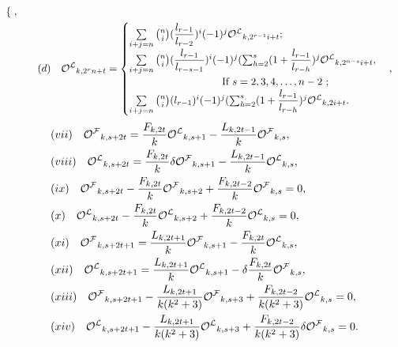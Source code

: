 \begin{theorem}
\begin{align*}
\begin{cases}
 \end{cases},\\
 &\qquad (d)\quad  {{\mathcal{O^L}}}_{k,{2^rn+t}}= \begin{cases}
\sum\limits_{i+j=n}\binom{n}{i}(\dfrac{l_{r-1}}{l_{r-2}})^i(-1)^j {{\mathcal{O^L}}}_{k,2^{r-1}i+t};\\
\sum\limits_{i+j=n}\binom{n}{i}(\dfrac{l_{r-1}}{l_{r-s-1}})^i(-1)^j (\sum_{h=2}^s(1+\dfrac{l_{r-1}}{l_{r-h}})^j{{\mathcal{O^L}}}_{k,2^{n-s}i+t}, &\\\quad\quad\quad\quad\quad\qquad\qquad \text{If $s=2, 3, 4,\hdots, n-2 $ };\\\sum\limits_{i+j=n}\binom{n}{i}({l_{r-1}})^i(-1)^j (\sum_{h=2}^s(1+\dfrac{l_{r-1}}{l_{r-h}})^j{{\mathcal{O^L}}}_{k,2i+t}.
 \end{cases},\\
 \end{align*}
\begin{align*}
 &(vii)\quad{{\mathcal{O^F}}}_{k,s+2t}=\dfrac{{F}_{k,2t}}{k}{{\mathcal{O^L}}}_{k,s+1}-\dfrac{{L}_{k,2t-1}}{k}{{\mathcal{O^F}}}_{k,s},\\
&(viii)\quad{{\mathcal{O^L}}}_{k,s+2t}=\dfrac{{F}_{k,2t}}{k}\delta{{\mathcal{O^F}}}_{k,s+1}-\dfrac{{L}_{k,2t-1}}{k}{{\mathcal{O^L}}}_{k,s},\\
&(ix)\quad{{\mathcal{O^F}}}_{k,s+2t}-\dfrac{{F}_{k,2t}}{k}{{\mathcal{O^F}}}_{k,s+2}+\dfrac{{F}_{k,2t-2}}{k}{{\mathcal{O^F}}}_{k,s}=0,\\
&(x)\quad{{\mathcal{O^L}}}_{k,s+2t}-\dfrac{{F}_{k,2t}}{k}{{\mathcal{O^L}}}_{k,s+2}+\dfrac{{F}_{k,2t-2}}{k}{{\mathcal{O^L}}}_{k,s}=0,\\
&(xi)\quad{{\mathcal{O^F}}}_{k,s+2t+1}=\dfrac{{L}_{k,2t+1}}{k}{{\mathcal{O^F}}}_{k,s+1}-\dfrac{{F}_{k,2t}}{k}{{\mathcal{O^L}}}_{k,s},\\
&(xii)\quad{{\mathcal{O^L}}}_{k,s+2t+1}=\dfrac{{L}_{k,2t+1}}{k}{{\mathcal{O^L}}}_{k,s+1}-\delta\dfrac{{F}_{k,2t}}{k}{{\mathcal{O^F}}}_{k,s},\\
&(xiii)\quad{{\mathcal{O^F}}}_{k,s+2t+1}-\dfrac{{L}_{k,2t+1}}{k(k^2+3)}{{\mathcal{O^F}}}_{k,s+3}+\dfrac{{F}_{k,2t-2}}{k(k^2+3)}{{\mathcal{O^L}}}_{k,s}=0,\\
&(xiv)\quad{{\mathcal{O^L}}}_{k,s+2t+1}-\dfrac{{L}_{k,2t+1}}{k(k^2+3)}{{\mathcal{O^L}}}_{k,s+3}+\dfrac{{F}_{k,2t-2}}{k(k^2+3)}\delta{{\mathcal{O^F}}}_{k,s}=0.
\end{align*}
\end{theorem}
